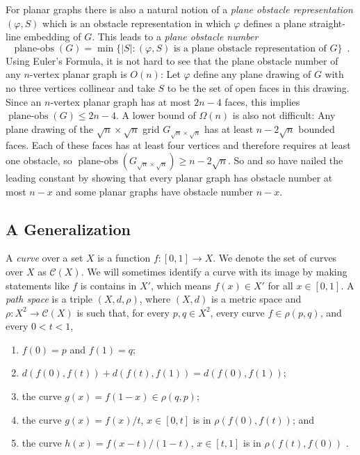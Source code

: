 \documentclass{patmorin}
\DeclareMathOperator{\planeobs}{plane-obs}
\begin{document}
For planar graphs there is also a natural notion of a \emph{plane obstacle
representation} $(\varphi, S)$ which is an obstacle representation
in which $\varphi$ defines a plane straight-line embedding of $G$.
This leads to a \emph{plane obstacle number}
\[
    \planeobs(G) = \min\{|S| :\text{$(\varphi, S)$ is a plane obstacle representation of $G$}\} \enspace .
\]
Using Euler's Formula, it is not hard to see that the plane obstacle
number of any $n$-vertex planar graph is $O(n)$: Let $\varphi$ define
any plane drawing of $G$ with no three vertices collinear and take $S$
to be the set of open faces in this drawing.  Since an $n$-vertex planar
graph has at most $2n-4$ faces, this implies $\planeobs(G)\le 2n-4$.
A lower bound of $\Omega(n)$ is also not difficult:  Any plane drawing
of the $\sqrt{n}\times\sqrt{n}$ grid $G_{\sqrt{n}\times\sqrt{n}}$
has at least $n-2\sqrt{n}$ bounded faces. Each of these faces has
at least four vertices and therefore requires at least one obstacle,
so $\planeobs(G_{\sqrt{n}\times\sqrt{n}})\ge n-2\sqrt{n}$.  So and so
\cite{X} have nailed the leading constant by showing that every planar
graph has obstacle number at most $n-x$ and some planar graphs have
obstacle number $n-x$.

\subsection{A Generalization}

A \emph{curve} over a set $X$ is a function $f:[0,1]\to X$. We denote the
set of curves over $X$ as $\mathcal{C}(X)$.  We will sometimes identify a
curve with its image by making statements like $f$ is contains in $X'$,
which means $f(x)\in X'$ for all $x\in[0,1]$.  A \emph{path space} is
a triple $(X,d,\rho)$, where $(X,d)$ is a metric space and $\rho:X^2\to
\mathcal{C}(X)$ is such that, for every $p,q\in X^2$, every curve $f\in
\rho(p,q)$, and every $0<t<1$,
\begin{enumerate}
  \item $f(0)=p$ and $f(1)=q$;
  \item $d(f(0),f(t)) + d(f(t),f(1)) = d(f(0),f(1))$; 
  \item the curve $g(x)=f(1-x)\in \rho(q,p)$;
  \item the curve $g(x)=f(x)/t$, $x\in[0,t]$ is in $\rho(f(0),f(t))$; and
  \item the curve $h(x)=f(x-t)/(1-t)$, $x\in[t,1]$ is in $\rho(f(t),f(0))$ \enspace .
\end{enumerate} 
\end{document}
